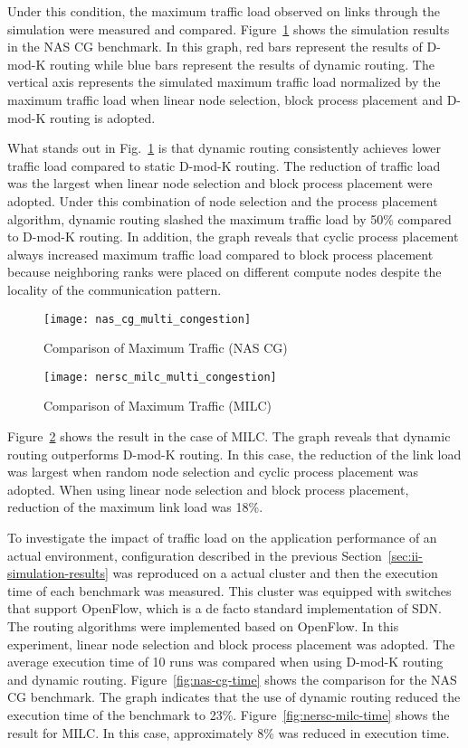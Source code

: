 Under this condition, the maximum traffic load observed on links through the
simulation were measured and compared.
Figure~\ref{fig:nas-cg-multi-congestion} shows the simulation results in
the NAS CG benchmark. In this graph, red bars represent the results of
\mbox{D-mod-K} routing while blue bars represent the results of dynamic
routing. The vertical axis represents the simulated maximum traffic load
normalized by the maximum traffic load when linear node selection, block
process placement and \mbox{D-mod-K} routing is adopted.

What stands out in Fig.~\ref{fig:nas-cg-multi-congestion} is that
dynamic routing consistently achieves lower traffic load compared to
static \mbox{D-mod-K} routing. The reduction of traffic load was the largest
when linear node selection and block process placement were adopted. Under
this combination of node selection and the process placement algorithm,
dynamic routing slashed the maximum traffic load by 50\% compared to
\mbox{D-mod-K} routing. In addition, the graph reveals that cyclic process
placement always increased maximum traffic load compared to block process
placement because neighboring ranks were placed on different compute nodes
despite the locality of the communication pattern.

\begin{figure}
    \centering
    \texttt{[image: nas\_cg\_multi\_congestion]}
    \caption{Comparison of Maximum Traffic (NAS CG)}%
    \label{fig:nas-cg-multi-congestion}
\end{figure}

\begin{figure}
    \centering
    \texttt{[image: nersc\_milc\_multi\_congestion]}
    \caption{Comparison of Maximum Traffic (MILC)}%
    \label{fig:nersc-milc-multi-congestion}
\end{figure}

Figure~\ref{fig:nersc-milc-multi-congestion} shows the result in the
case of MILC\@. The graph reveals that dynamic routing outperforms
\mbox{D-mod-K} routing. In this case, the reduction of the link load was
largest when random node selection and cyclic process placement was
adopted. When using linear node selection and block process placement,
reduction of the maximum link load was 18\%.

To investigate the impact of traffic load on the application performance of an
actual environment, configuration described in the previous
Section~\ref{sec:ii-simulation-results} was reproduced on a actual cluster and
then the execution time of each benchmark was measured. This cluster was
equipped with switches that support OpenFlow, which is a de facto standard
implementation of SDN\@. The routing algorithms were implemented based on
OpenFlow. In this experiment, linear node selection and block process
placement was adopted. The average execution time of 10 runs was compared when
using \mbox{D-mod-K} routing and dynamic routing. Figure~\ref{fig:nas-cg-time}
shows the comparison for the NAS CG benchmark. The graph indicates that the
use of dynamic routing reduced the execution time of the benchmark to 23\%.
Figure~\ref{fig:nersc-milc-time} shows the result for MILC\@. In this case,
approximately 8\% was reduced in execution time.

